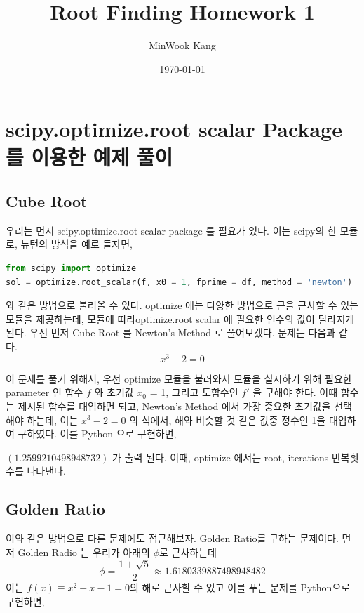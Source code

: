 \documentclass[11pt]{article}
\title{Root Finding Homework 1}
\author{MinWook Kang}
\date{\today}
\begin{document}
\maketitle
\pagebreak





\section{scipy.optimize.root scalar Package를 이용한 예제 풀이}
\subsection{Cube Root} 

우리는 먼저 scipy.optimize.root scalar package 를 필요가 있다. 이는 scipy의 한 모듈로, 뉴턴의 방식을 예로 들자면,
\vspace{5mm}
\begin{lstlisting}[language=Python]
from scipy import optimize
sol = optimize.root_scalar(f, x0 = 1, fprime = df, method = 'newton')
\end{lstlisting}

\noindent
와 같은 방법으로 불러올 수 있다. optimize 에는 다양한 방법으로 근을 근사할 수 있는 모듈을 제공하는데, 모듈에 따라optimize.root scalar 에 필요한 인수의 값이 달라지게 된다.  우선 먼저 Cube Root 를 Newton's Method 로 풀어보겠다. 문제는 다음과 같다.
\begin{equation}
 x^3  -  2 =  0
\end{equation}

\noindent
이 문제를 풀기 위해서, 우선 optimize 모듈을 불러와서 모듈을 실시하기 위해 필요한 parameter 인 함수 $f$ 와 초기값 $x_0$ = 1, 그리고 도함수인 $f'$ 을 구해야 한다. 이때 함수는 제시된 함수를 대입하면 되고, Newton's Method 에서 가장 중요한 초기값을 선택해야 하는데, 이는 $x^3 - 2 = 0$ 의 식에서, 해와 비슷할 것 같은 값중 정수인 1을 대입하여 구하였다.  이를 Python 으로 구현하면,
\vspace{5mm}

\vspace{5mm}

\noindent
$(1.2599210498948732)$ 가 출력 된다. 이때, optimize 에서는 root, iterations-반복횟수를 나타낸다. 

\subsection{Golden Ratio} 
이와 같은 방법으로 다른 문제에도 접근해보자. Golden Ratio를 구하는 문제이다. 먼저 Golden Radio 는 우리가 아래의 $\phi$로 근사하는데
$$
\phi = \frac{1 + \sqrt 5}{2} \approx 1.6180339887498948482
$$
\noindent
이는 $f(x) \equiv x^2 - x - 1 = 0$의 해로 근사할 수 있고 이를 푸는 문제를 Python으로 구현하면,
\end{document}
